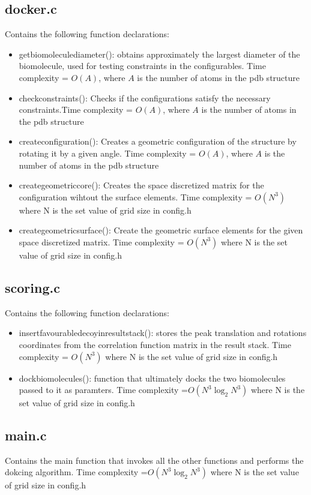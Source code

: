 \documentclass{article}
\begin{document}
\subsection{docker.c}
Contains the following function declarations:
\begin{itemize}
\item get\textunderscore biomolecule\textunderscore diameter(): obtains approximately the largest diameter of the biomolecule, used for testing constraints in the configurables. Time complexity = $O(A)$, where $A$ is the number of atoms in the pdb structure
\item check\textunderscore constraints(): Checks if the configurations satisfy the necessary constraints.Time complexity = $O(A)$, where $A$ is the number of atoms in the pdb structure
\item create\textunderscore configuration(): Creates a geometric configuration of the structure by rotating it by a given angle. Time complexity = $O(A)$, where $A$ is the number of atoms in the pdb structure
\item create\textunderscore geometric\textunderscore core(): Creates the space discretized matrix for the configuration wihtout the surface elements. Time complexity = $O(N^3)$ where N is the set value of grid size in config.h
\item create\textunderscore geometric\textunderscore surface(): Create the geometric surface elements for the given space discretized matrix. Time complexity = $O(N^3)$ where N is the set value of grid size in config.h
\end{itemize}
\subsection{scoring.c}
Contains the following function declarations:
\begin{itemize}
\item insert\textunderscore favourable\textunderscore decoy\textunderscore in\textunderscore result\textunderscore stack(): stores the peak translation and rotations coordinates from the correlation function matrix in the result stack. Time complexity = $O(N^3)$ where N is the set value of grid size in config.h
\item dock\textunderscore biomolecules(): function that ultimately docks the two biomolecules passed to it as paramters. Time complexity =$O(N^3\log_2 N^3)$ where N is the set value of grid size in config.h
\end{itemize}
\subsection{main.c}
Contains the main function that invokes all the other functions and performs the dokcing algorithm. Time complexity =$O(N^3\log_2 N^3)$ where N is the set value of grid size in config.h
\end{document}
